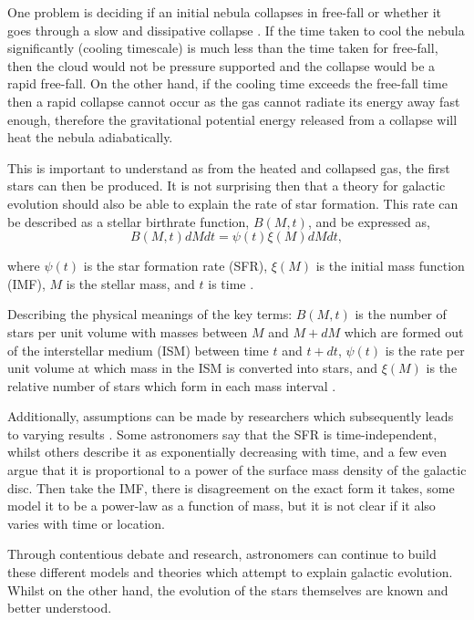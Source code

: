 \documentclass[12pt, twocolumn]{revtex4}    %
\begin{document}
One problem is deciding if an initial nebula collapses in free-fall or whether it goes through a slow and dissipative collapse \citep{carroll_astro}. If the time taken to cool the nebula significantly (cooling timescale) is much less than the time taken for free-fall, then the cloud would not be pressure supported and the collapse would be a rapid free-fall. On the other hand, if the cooling time exceeds the free-fall time then a rapid collapse cannot occur as the gas cannot radiate its energy away fast enough, therefore the gravitational potential energy released from a collapse will heat the nebula adiabatically. 

This is important to understand as from the heated and collapsed gas, the first stars can then be produced. It is not surprising then that a theory for galactic evolution should also be able to explain the rate of star formation. This rate can be described as a stellar birthrate function, $B(M,t)$, and be expressed as,
\begin{equation}
B(M,t)dM dt = \psi (t) \xi (M) dM dt, 
\label{eqn:stellar_birth_rate}
\end{equation}

where $\psi(t)$ is the star formation rate (SFR), $\xi (M)$ is the initial mass function (IMF), $M$ is the stellar mass, and $t$ is time \citep{carroll_astro}. 

Describing the physical meanings of the key terms: $B(M,t)$ is the number of stars per unit volume with masses between $M$ and $M+dM$ which are formed out of the interstellar medium (ISM) between time $t$ and $t+dt$, $\psi(t)$ is the rate per unit volume at which mass in the ISM is converted into stars, and $\xi(M)$ is the relative number of stars which form in each mass interval \citep{carroll_astro}. 

Additionally, assumptions can be made by researchers which subsequently leads to varying results \citep{carroll_astro}. Some astronomers say that the SFR is time-independent, whilst others describe it as exponentially decreasing with time, and a few even argue that it is proportional to a power of the surface mass density of the galactic disc. Then take the IMF, there is disagreement on the exact form it takes, some model it to be a power-law as a function of mass, but it is not clear if it also varies with time or location.

Through contentious debate and research, astronomers can continue to build these different models and theories which attempt to explain galactic evolution. Whilst on the other hand, the evolution of the stars themselves are known and better understood. 
\end{document}
